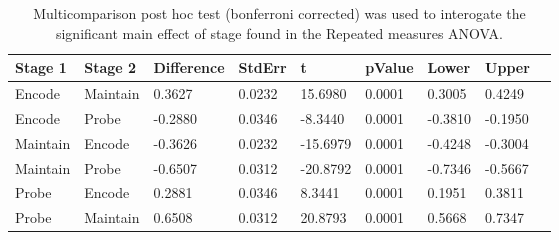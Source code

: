 \begin{table}
\centering
\begin{tabular}[0.2em]{@{}lllllllll@{}}\toprule
Stage 1 & Stage 2 & Difference & StdErr & t & pValue & Lower & Upper\\\toprule[0.2em]
Encode & Maintain & 0.3627 & 0.0232 & 15.6980 & 0.0001 & 0.3005 & 0.4249 \\\midrule
Encode & Probe & -0.2880 & 0.0346 & -8.3440 & 0.0001 & -0.3810 & -0.1950 \\\midrule
Maintain & Encode & -0.3626 & 0.0232 & -15.6979 & 0.0001 & -0.4248 & -0.3004 \\\midrule
Maintain & Probe & -0.6507 & 0.0312 & -20.8792 & 0.0001 & -0.7346 & -0.5667 \\\midrule
Probe & Encode & 0.2881 & 0.0346 & 8.3441 & 0.0001 & 0.1951 & 0.3811 \\\midrule
Probe & Maintain & 0.6508 & 0.0312 & 20.8793 & 0.0001 & 0.5668 & 0.7347 \\\bottomrule[0.2em]
\end{tabular}
\caption{Multicomparison post hoc test (bonferroni corrected) was used to interogate the significant main effect of stage found in the Repeated measures ANOVA.\label{tabel:tbl_RMABA2_PH_Stage}}
\end{table}
